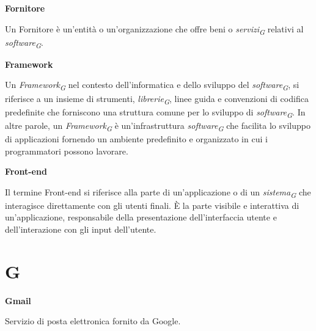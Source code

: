 \documentclass{article}
\begin{document}
\vspace{0.4cm}

\textbf{Fornitore}

\vspace{0.1cm}

Un Fornitore è un'entità o un'organizzazione che offre beni o \textit{servizi}\textsubscript{\textit{G}} relativi al \textit{software}\textsubscript{\textit{G}}.

\vspace{0.4cm}

\textbf{Framework}

\vspace{0.1cm}

Un \textit{Framework}\textsubscript{\textit{G}} nel contesto dell'informatica e dello sviluppo del \textit{software}\textsubscript{\textit{G}}, si riferisce a un insieme di strumenti, \textit{librerie}\textsubscript{\textit{G}}, linee guida e convenzioni di codifica predefinite che forniscono una struttura comune per lo sviluppo di \textit{software}\textsubscript{\textit{G}}. In altre parole, un \textit{Framework}\textsubscript{\textit{G}} è un'infrastruttura \textit{software}\textsubscript{\textit{G}} che facilita lo sviluppo di applicazioni fornendo un ambiente predefinito e organizzato in cui i programmatori possono lavorare.

\vspace{0.4cm}

\textbf{Front-end}

\vspace{0.1cm}

Il termine Front-end si riferisce alla parte di un'applicazione o di un \textit{sistema}\textsubscript{\textit{G}} che interagisce direttamente con gli utenti finali. È la parte visibile e interattiva di un'applicazione, responsabile della presentazione dell'interfaccia utente e dell'interazione con gli input dell'utente.

\pagebreak
\section*{G}
{}

\vspace{0.4cm}

\textbf{Gmail}

\vspace{0.1cm}

Servizio di posta elettronica fornito da Google.
\end{document}
